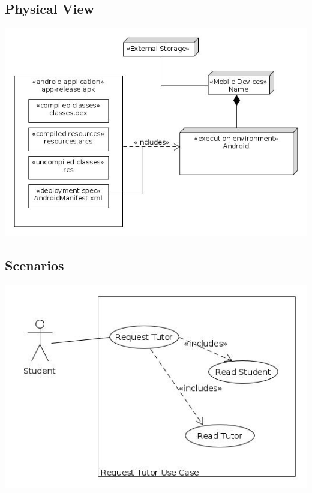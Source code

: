 \documentclass[12pt]{article}
\begin{document}
\subsection{Physical View}
\includegraphics[width=140mm]{./Deployment.jpg}
\subsection{Scenarios}
\includegraphics[width=140mm]{./RequestTutor.jpg}
\end{document}
